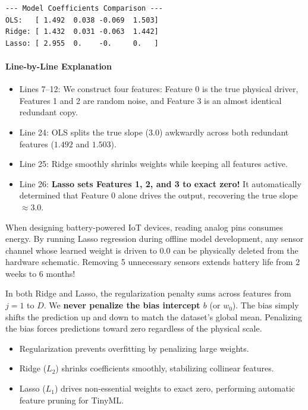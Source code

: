 \begin{lstlisting}[style=outputstyle]
--- Model Coefficients Comparison ---
OLS:   [ 1.492  0.038 -0.069  1.503]
Ridge: [ 1.432  0.031 -0.063  1.442]
Lasso: [ 2.955  0.    -0.     0.   ]
\end{lstlisting}

\paragraph{Line-by-Line Explanation}
\begin{itemize}
    \item Lines 7--12: We construct four features: Feature 0 is the true physical driver, Features 1 and 2 are random noise, and Feature 3 is an almost identical redundant copy.
    \item Line 24: OLS splits the true slope ($3.0$) awkwardly across both redundant features ($1.492$ and $1.503$).
    \item Line 25: Ridge smoothly shrinks weights while keeping all features active.
    \item Line 26: \textbf{Lasso sets Features 1, 2, and 3 to exact zero!} It automatically determined that Feature 0 alone drives the output, recovering the true slope $\approx 3.0$.
\end{itemize}

\begin{iotbox}
When designing battery-powered IoT devices, reading analog pins consumes energy. By running Lasso regression during offline model development, any sensor channel whose learned weight is driven to $0.0$ can be physically deleted from the hardware schematic. Removing 5 unnecessary sensors extends battery life from 2 weeks to 6 months!
\end{iotbox}

\begin{warning}
In both Ridge and Lasso, the regularization penalty sums across features from $j=1$ to $D$. We \textbf{never penalize the bias intercept $b$} (or $w_0$). The bias simply shifts the prediction up and down to match the dataset's global mean. Penalizing the bias forces predictions toward zero regardless of the physical scale.
\end{warning}

\begin{takeaways}
\begin{itemize}
    \item Regularization prevents overfitting by penalizing large weights.
    \item Ridge ($L_2$) shrinks coefficients smoothly, stabilizing collinear features.
    \item Lasso ($L_1$) drives non-essential weights to exact zero, performing automatic feature pruning for TinyML.
\end{itemize}
\end{takeaways}


